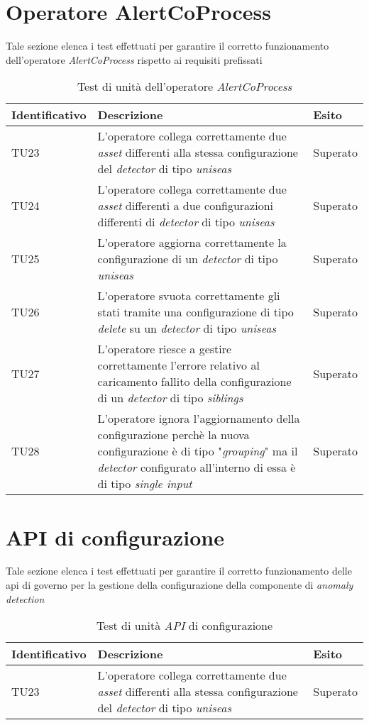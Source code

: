 \section{Operatore AlertCoProcess}
Tale sezione elenca i test effettuati per garantire il corretto funzionamento dell'operatore \textit{AlertCoProcess} rispetto ai requisiti prefissati

{
\centering
\begin{longtable}{L{3cm} L{8.5cm} L{2cm}}
\caption{Test di unità dell'operatore \textit{AlertCoProcess}}\\
\textbf{Identificativo} &
\textbf{Descrizione}&
\textbf{Esito}\\
\endhead
\hline

TU23 & L'operatore collega correttamente due \textit{asset} differenti alla stessa configurazione del \textit{detector} di tipo \textit{uniseas} & Superato\\
\hline
TU24 & L'operatore collega correttamente due \textit{asset} differenti a due configurazioni differenti di \textit{detector} di tipo \textit{uniseas} & Superato \\
\hline
TU25 &  L'operatore aggiorna correttamente la configurazione di un \textit{detector} di tipo \textit{uniseas} & Superato\\
\hline
TU26 & L'operatore svuota correttamente gli stati tramite una configurazione di tipo \textit{delete} su un \textit{detector} di tipo \textit{uniseas} & Superato \\
\hline
TU27 & L'operatore riesce a gestire correttamente l'errore relativo al caricamento fallito della configurazione di un \textit{detector} di tipo \textit{siblings} & Superato\\
\hline
TU28 & L'operatore ignora l'aggiornamento della configurazione perchè la nuova configurazione è di tipo "\textit{grouping}" ma il \textit{detector} configurato all'interno di essa è di tipo \textit{single input} & Superato \\
\hline
\end{longtable}
}

\section{API di configurazione}
Tale sezione elenca i test effettuati per garantire il corretto funzionamento delle \gls{api} di governo per la gestione della configurazione della componente di \textit{anomaly detection}

{
\centering
\begin{longtable}{L{3cm} L{8.5cm} L{2cm}}
\caption{Test di unità \textit{API} di configurazione}\\
\textbf{Identificativo} &
\textbf{Descrizione}&
\textbf{Esito}\\
\endhead
\hline

TU23 & L'operatore collega correttamente due \textit{asset} differenti alla stessa configurazione del \textit{detector} di tipo \textit{uniseas} & Superato\\
\hline
\end{longtable}
}


